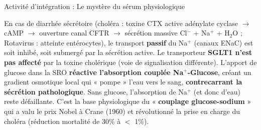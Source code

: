 \documentclass[11pt]{article}
\begin{document}
\begin{exoresolu}{Activité d'intégration : Le mystère du sérum physiologique}
\begin{enumerate}
    En cas de diarrhée sécrétoire (choléra : toxine CTX active adénylate cyclase $\rightarrow$ cAMP $\rightarrow$ ouverture canal CFTR $\rightarrow$ sécrétion massive Cl$^-$ + Na$^+$ + H$_2$O ; Rotavirus : atteinte entérocytes), le transport \textbf{passif} du Na$^+$ (canaux ENaC) est soit inhibé, soit submergé par la sécrétion active. Le transporteur \textbf{SGLT1 n'est pas affecté} par la toxine cholérique (voie de signalisation différente). L'apport de glucose dans la SRO \textbf{réactive l'absorption couplée Na$^+$-Glucose}, créant un gradient osmotique local qui « pompe » l'eau vers le sang, \textbf{contrecarrant la sécrétion pathologique}. Sans glucose, l'absorption de Na$^+$ (et donc d'eau) reste défaillante. C'est la base physiologique du « \textbf{couplage glucose-sodium} » qui a valu le prix Nobel à Crane (1960) et révolutionné la prise en charge du choléra (réduction mortalité de 30\% à $<$ 1\%).
\end{enumerate}
\end{exoresolu}
\end{document}
